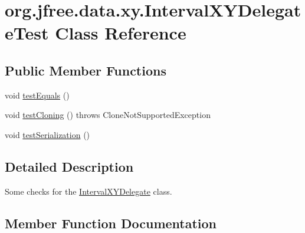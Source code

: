 \hypertarget{classorg_1_1jfree_1_1data_1_1xy_1_1_interval_x_y_delegate_test}{}\section{org.\+jfree.\+data.\+xy.\+Interval\+X\+Y\+Delegate\+Test Class Reference}
\label{classorg_1_1jfree_1_1data_1_1xy_1_1_interval_x_y_delegate_test}
\subsection*{Public Member Functions}
\begin{DoxyCompactItemize}
\item 
void \mbox{\hyperlink{classorg_1_1jfree_1_1data_1_1xy_1_1_interval_x_y_delegate_test_a9f0fd060226fb1b6f5d3c6d4da700bbd}{test\+Equals}} ()
\item 
void \mbox{\hyperlink{classorg_1_1jfree_1_1data_1_1xy_1_1_interval_x_y_delegate_test_ac049e4c23a453e6b31d7a840ff1e4ce2}{test\+Cloning}} ()  throws Clone\+Not\+Supported\+Exception 
\item 
void \mbox{\hyperlink{classorg_1_1jfree_1_1data_1_1xy_1_1_interval_x_y_delegate_test_a290f196722366a10a63b2bcd40270b77}{test\+Serialization}} ()
\end{DoxyCompactItemize}


\subsection{Detailed Description}
Some checks for the \mbox{\hyperlink{classorg_1_1jfree_1_1data_1_1xy_1_1_interval_x_y_delegate}{Interval\+X\+Y\+Delegate}} class. 

\subsection{Member Function Documentation}
\mbox{\label{classorg_1_1jfree_1_1data_1_1xy_1_1_interval_x_y_delegate_test_ac049e4c23a453e6b31d7a840ff1e4ce2}} 
